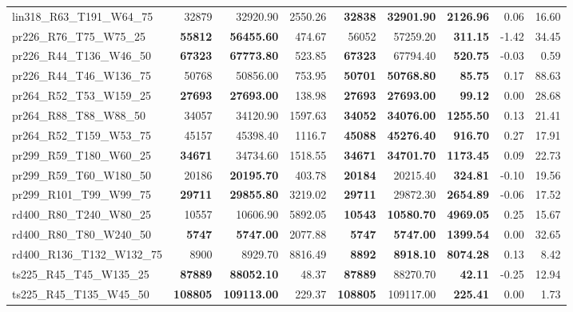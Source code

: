 \documentclass{singlecol-new}
\begin{document}
{\begin{longtable}{lrrrrrrrr}
		lin318\_R63\_T191\_W64\_75 & 32879 & 32920.90 & 2550.26 & \textbf{32838} & \textbf{32901.90} & \textbf{2126.96} & 0.06 & 16.60 \\
		pr226\_R76\_T75\_W75\_25 & \textbf{55812} & \textbf{56455.60} & 474.67 & 56052 & 57259.20 & \textbf{311.15} & -1.42 & 34.45 \\
		pr226\_R44\_T136\_W46\_50 & \textbf{67323} & \textbf{67773.80} & 523.85 & \textbf{67323} & 67794.40 & \textbf{520.75} & -0.03 & 0.59 \\
		pr226\_R44\_T46\_W136\_75 & 50768 & 50856.00 & 753.95 & \textbf{50701} & \textbf{50768.80} & \textbf{85.75} & 0.17 & 88.63 \\
		pr264\_R52\_T53\_W159\_25 & \textbf{27693} & \textbf{27693.00} & 138.98 & \textbf{27693} & \textbf{27693.00} & \textbf{99.12} & 0.00 & 28.68 \\
		pr264\_R88\_T88\_W88\_50 & 34057 & 34120.90 & 1597.63 & \textbf{34052} & \textbf{34076.00} & \textbf{1255.50} & 0.13 & 21.41 \\
		pr264\_R52\_T159\_W53\_75 & 45157 & 45398.40 & 1116.7 & \textbf{45088} & \textbf{45276.40} & \textbf{916.70} & 0.27 & 17.91 \\
		pr299\_R59\_T180\_W60\_25 & \textbf{34671} & 34734.60 & 1518.55 & \textbf{34671} & \textbf{34701.70} & \textbf{1173.45} & 0.09 & 22.73 \\
		pr299\_R59\_T60\_W180\_50 & 20186 & \textbf{20195.70} & 403.78 & \textbf{20184} & 20215.40 & \textbf{324.81} & -0.10 & 19.56 \\
		pr299\_R101\_T99\_W99\_75 & \textbf{29711} & \textbf{29855.80} & 3219.02 & \textbf{29711} & 29872.30 & \textbf{2654.89} & -0.06 & 17.52 \\
		rd400\_R80\_T240\_W80\_25 & 10557 & 10606.90 & 5892.05 & \textbf{10543} & \textbf{10580.70} & \textbf{4969.05} & 0.25 & 15.67 \\
		rd400\_R80\_T80\_W240\_50 & \textbf{5747} & \textbf{5747.00} & 2077.88 & \textbf{5747} & \textbf{5747.00} & \textbf{1399.54} & 0.00 & 32.65 \\
		rd400\_R136\_T132\_W132\_75 & 8900 & 8929.70 & 8816.49 & \textbf{8892} & \textbf{8918.10} & \textbf{8074.28} & 0.13 & 8.42 \\
		ts225\_R45\_T45\_W135\_25 & \textbf{87889} & \textbf{88052.10} & 48.37 & \textbf{87889} & 88270.70 & \textbf{42.11} & -0.25 & 12.94 \\
		ts225\_R45\_T135\_W45\_50 & \textbf{108805} & \textbf{109113.00} & 229.37 & \textbf{108805} & 109117.00 & \textbf{225.41} & 0.00 & 1.73 \\

\end{longtable}}
\end{document}

